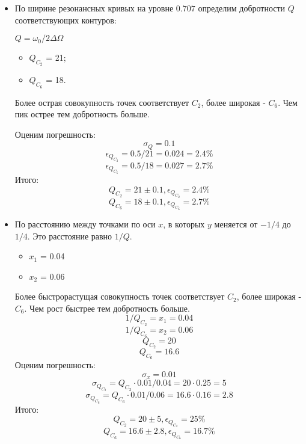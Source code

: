 \documentclass[12pt,a4paper]{article}
\begin{document}
        \begin{itemize}
            \item По ширине резонансных кривых на уровне $0.707$ определим добротности $Q$ соответствующих контуров: 
            
            $Q = \omega_0 / 2\Delta \Omega$
            \begin{itemize}
                \item $Q_{C_2}$ = 21;
                \item $Q_{C_6}$ = 18.
            \end{itemize}
            
            Более острая совокупность точек соответствует $C_2$, более широкая - $C_6$. Чем пик острее тем добротность больше.
            
            Оценим погрешность:
            \[
            \sigma_Q = 0.1
            \]
            \[
            \epsilon_{Q_{C_2}} = 0.5/21 = 0.024 = 2.4\%
            \]
            \[
            \epsilon_{Q_{C_6}} = 0.5/18 = 0.027 = 2.7\%
            \]        
            Итого:
            \[
            Q_{C_2} = 21 \pm 0.1, \epsilon_{Q_{C_2}} = 2.4\%
            \]
            \[
            Q_{C_6} = 18 \pm 0.1, \epsilon_{Q_{C_6}} = 2.7\%
            \]
\newpage
            \item По расстоянию между точками по оси $x$, в которых $y$ меняется от $-1/4$ до $1/4$. Это расстояние равно $1/Q$.
            \begin{itemize}
                \item $x_1$ = 0.04
                \item $x_2$ = 0.06
            \end{itemize}
            Более быстрорастущая совокупность точек соответствует $C_2$, более широкая - $C_6$. Чем рост быстрее тем добротность больше.
            \[
            1/Q_{C_2} = x_1 = 0.04
            \]
            \[
            1/Q_{C_6} = x_2 = 0.06
            \]
            \[
            Q_{C_2} = 20 
            \]
            \[
            Q_{C_6} = 16.6 
            \]
            Оценим погрешность:
            \[
            \sigma_x = 0.01
            \]            
            \[
            \sigma_{Q_{C_2}} = Q_{C_2} \cdot 0.01/0.04 = 20 \cdot 0.25 = 5
            \]
            \[
            \sigma_{Q_{C_6}} = Q_{C_6} \cdot 0.01/0.06 = 16.6 \cdot 0.16 = 2.8
            \]
             Итого:
            \[
            Q_{C_2} = 20 \pm 5, \epsilon_{Q_{C_2}} = 25\%
            \]
            \[
            Q_{C_6} = 16.6 \pm 2.8, \epsilon_{Q_{C_6}} = 16.7\%
            \]
            \end{itemize}
        
\end{document}
